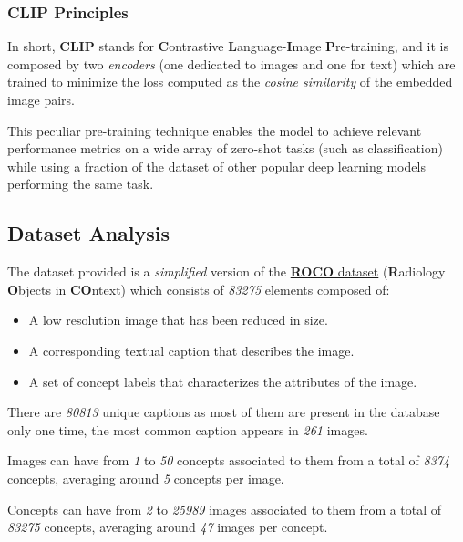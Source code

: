 \documentclass[12pt, a4paper]{article}
\begin{document}
\subsubsection*{CLIP Principles}
In short, \textbf{CLIP} stands for \textbf{C}ontrastive \textbf{L}anguage-\textbf{I}mage \textbf{P}re-training, and it is composed by two \textit{encoders} (one dedicated to images and one for text) which are trained to minimize the loss computed as the \textit{cosine similarity} of the embedded image pairs.

This peculiar pre-training technique enables the model to achieve relevant performance metrics on a wide array of zero-shot tasks (such as classification) while using a fraction of the dataset of other popular deep learning models performing the same task.

\subsection{Dataset Analysis}

The dataset provided is a \textit{simplified} version of the \href{https://link.springer.com/chapter/10.1007/978-3-030-01364-6_20}{\textbf{ROCO} dataset} (\textbf{R}adiology \textbf{O}bjects in \textbf{CO}ntext) which consists of \textit{83275} elements composed of:

\begin{itemize}
    \item A low resolution image that has been reduced in size.
    \item A corresponding textual caption that describes the image.
    \item A set of concept labels that characterizes the attributes of the image.
\end{itemize}

There are \textit{80813} unique captions as most of them are present in the database only one time, the most common caption appears in \textit{261} images.

Images can have from \textit{1} to \textit{50} concepts associated to them from a total of \textit{8374} concepts, averaging around \textit{5} concepts per image.

Concepts can have from \textit{2} to \textit{25989} images associated to them from a total of \textit{83275} concepts, averaging around \textit{47} images per concept.
\end{document}
